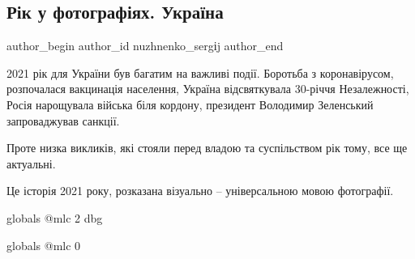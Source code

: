  
 
 
 
 
\subsection{Рік у фотографіях. Україна}
\label{sec:17_01_2022.stz.news.ua.radiosvoboda.1.ukraina_rik_foto}

\ifcmt
 author_begin
   author_id nuzhnenko_sergіj
 author_end
\fi

\begin{zznagolos}
2021 рік для України був багатим на важливі події. Боротьба з коронавірусом,
розпочалася вакцинація населення, Україна відсвяткувала 30-річчя Незалежності,
Росія нарощувала війська біля кордону, президент Володимир Зеленський
запроваджував санкції.

Проте низка викликів, які стояли перед владою та суспільством рік тому, все ще
актуальні.

Це історія 2021 року, розказана візуально – універсальною мовою фотографії.
\end{zznagolos}

\ifcmt
  globals
  @mlc 2
  dbg
\fi


\ifcmt
  globals
  @mlc 0
\fi
